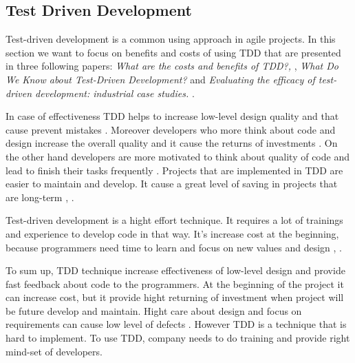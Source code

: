 \subsection*{Test Driven Development}

Test-driven development is a common using approach in agile projects. In this section we want to focus on benefits and costs of using TDD that are presented in three following papers: \textit{ What are the costs and benefits of TDD?,}  \cite{costsbenefitstdd},\textit{ What Do We Know about Test-Driven Development?} \cite{whatdoweknowabouttdd} and \textit{Evaluating the efficacy of test-driven development: industrial case studies.} \cite{evaluatingefficacy}. 

In case of effectiveness TDD helps to increase low-level design quality \cite{evaluatingefficacy} and that cause prevent mistakes \cite{whatdoweknowabouttdd}. Moreover developers who more think about code and design increase the overall quality and it cause the returns of investments \cite{whatdoweknowabouttdd}. On the other hand developers are more motivated to think about quality of code and lead to finish their tasks frequently \cite{evaluatingefficacy}. Projects that are implemented in TDD are easier to maintain and develop. It cause a great level of saving in projects that are long-term \cite{evaluatingefficacy}, \cite{whatdoweknowabouttdd}. 

Test-driven development is a hight effort technique. It requires a lot of trainings and experience to develop code in that way. It's increase cost at the beginning, because programmers need time to learn and focus on new values and design \cite{whatdoweknowabouttdd}, \cite{evaluatingefficacy}.

To sum up, TDD technique increase effectiveness of low-level design and provide fast feedback about code to the programmers. At the beginning of the project it can increase cost, but it provide hight returning of investment when project will be future develop and maintain. Hight care about design and focus on requirements can cause low level of defects \cite{costsbenefitstdd}. However TDD is a technique that is hard to implement. To use TDD, company needs to do training and provide right mind-set of developers.
